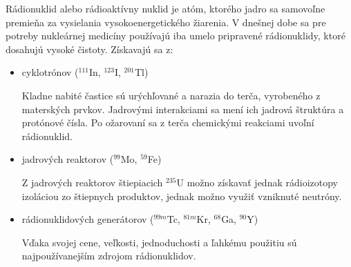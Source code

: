 \documentclass[../../main.tex]{subfiles}
\begin{document}
Rádionuklid alebo rádioaktívny nuklid je atóm, ktorého jadro sa samovoľne premieňa za vysielania vysokoenergetického žiarenia. V dnešnej dobe sa pre potreby nukleárnej medicíny používajú iba umelo pripravené rádionuklidy, ktoré dosahujú vysoké čistoty. Získavajú sa z:

\begin{itemize}
\item cyklotrónov ($^{111}$In, $^{123}$I, $^{201}$Tl)

Kladne nabité častice sú urýchľované a narazia do terča, vyrobeného z materských prvkov. Jadrovými interakciami sa mení ich jadrová štruktúra a protónové čísla. Po ožarovaní sa z terča chemickými reakciami uvoľní rádionuklid.

\item jadrových reaktorov ($^{99}$Mo, $^{59}$Fe)

Z jadrových reaktorov štiepiacich $^{235}$U možno získavať jednak rádioizotopy izoláciou zo štiepnych produktov, jednak možno využiť vzniknuté neutróny. 

\item rádionuklidových generátorov ($^{99m}$Tc, $^{81m}$Kr, $^{68}$Ga, $^{90}$Y)

Vďaka svojej cene, veľkosti, jednoduchosti a ľahkému použitiu sú najpoužívanejším zdrojom rádionuklidov.
\end{itemize}
\end{document}
